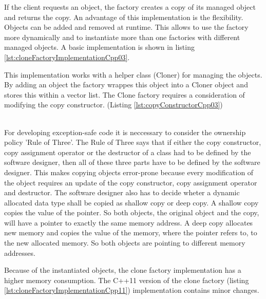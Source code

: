 {\noindent If the client requests an object, the factory creates a copy of its managed object and returns the copy. An advantage of this implementation is the flexibility. Objects can be added and removed at runtime. This allows to use the factory more dynamically and to instantiate more than one factories with different managed objects. A basic implementation is shown in listing \ref{lst:cloneFactoryImplementationCpp03}.

\newpage



\noindent This implementation works with a helper class (Cloner) for managing the objects. By adding an object the factory wrappes this object into a Cloner object and stores this within a vector list. The Clone factory requires a consideration of modifying the copy constructor. (Listing \ref{lst:copyConstructorCpp03}) 

\noindent\\ For developing exception-safe code it is neccessary to consider the ownership policy 'Rule of Three'. The Rule of Three says that if either the copy constructor, copy assignment operator or the destructor of a class had to be defined by the software designer, then all of these three parts have to be defined by the software designer. This makes copying objects error-prone because every modification of the object requires an update of the copy constructor, copy assignment operator and destructor. The software designer also has to decide wheter a dynamic allocated data type shall be copied as shallow copy or deep copy. A shallow copy copies the value of the pointer. So both objects, the original object and the copy, will have a pointer to exactly the same memory address. A deep copy allocates new memory and copies the value of the memory, where the pointer refers to, to the new allocated memory. So both objects are pointing to different memory addresses.

\newpage



\noindent Because of the instantiated objects, the clone factory implementation has a higher memory consumption. The C++11 version of the clone factory (listing \ref{lst:cloneFactoryImplementationCpp11}) implementation contains minor changes. 

}
